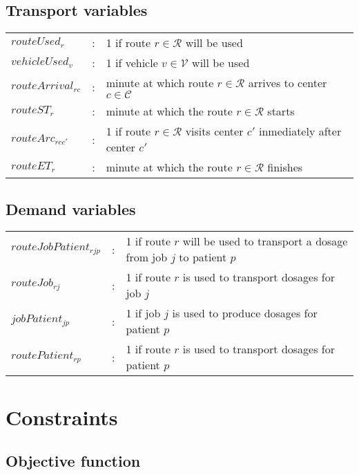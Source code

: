 \subsection{Transport variables}

\begin{tabular}{p{30mm}lp{90mm}}
    $routeUsed_{r}$    	& : & 1 if route $r \in \mathcal{R}$ will be used  \\  
    $vehicleUsed_{v}$    & : & 1 if vehicle $v \in \mathcal{V}$ will be used  \\  
    $routeArrival_{rc}$    & : & minute at which route $r \in \mathcal{R}$ arrives to center $c \in \mathcal{C}$ \\  
    $routeST_{r}$    		& : & minute at which the route $r \in \mathcal{R}$ starts \\
    $routeArc_{rcc'}$   & : & 1 if route $r \in \mathcal{R}$ visits center $c'$ inmediately after center $c'$  \\
    $routeET_{r}$   		& : & minute at which the route $r \in \mathcal{R}$ finishes \\
\end{tabular}
\bigskip

\subsection{Demand variables}

\begin{tabular}{p{40mm}lp{80mm}}
    $routeJobPatient_{rjp}$    & : & 1 if route $r$ will be used to transport a dosage from job $j$ to patient $p$ \\  
    $routeJob_{rj}$    					& : & 1 if route $r$ is used to transport dosages for job $j$ \\  
    $jobPatient_{jp}$    				& : & 1 if job $j$ is used to produce dosages for patient $p$ \\  
    $routePatient_{rp}$    			& : & 1 if route $r$ is used to transport dosages for patient $p$\\
\end{tabular}
\bigskip


\section{Constraints}

\subsection{Objective function}

